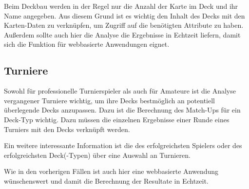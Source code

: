 Beim Deckbau werden in der Regel nur die Anzahl der Karte im Deck und ihr Name angegeben. Aus diesem Grund ist es wichtig den Inhalt des Decks mit den Karten-Daten zu verknüpfen, um Zugriff auf die benötigten Attribute zu haben. Außerdem sollte auch hier die Analyse die Ergebnisse in Echtzeit liefern, damit sich die Funktion für webbasierte Anwendungen eignet.

\subsection{Turniere}
Sowohl für professionelle Turnierspieler als auch für Amateure ist die Analyse vergangener Turniere wichtig, um ihre Decks bestmöglich an potentiell überlegende Decks anzupassen. Dazu ist die Berechnung des Match-Ups für ein Deck-Typ wichtig. Dazu müssen die einzelnen Ergebnisse einer Runde eines Turniers mit den Decks verknüpft werden.

Ein weitere interessante Information ist die des erfolgreichsten Spielers oder des erfolgreichsten Deck(-Typen) über eine Auswahl an Turnieren. 

Wie in den vorherigen Fällen ist auch hier eine webbasierte Anwendung wünschenswert und damit die Berechnung der Resultate in Echtzeit.

